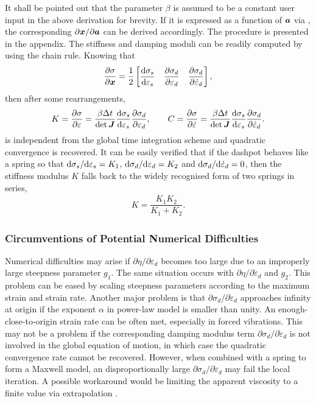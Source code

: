 It shall be pointed out that the parameter $\beta$ is assumed to be a constant user input in the above derivation for brevity. If it is expressed as a function of $\bm{a}$ via , the corresponding $\partial\bm{x}/\partial\bm{a}$ can be derived accordingly. The procedure is presented in the appendix. The stiffness and damping moduli can be readily computed by using the chain rule. Knowing that
\begin{gather}\label{eq:moduli}
\dfrac{\partial{\sigma}}{\partial{\bm{x}}}=\dfrac{1}{2}\begin{bmatrix}
\dfrac{\mathrm{d}\sigma_s}{\mathrm{d}\varepsilon_s}&\dfrac{\partial{\sigma_d}}{\partial{\varepsilon_d}}&\dfrac{\partial{\sigma_d}}{\partial{\dot\varepsilon_d}}
\end{bmatrix},
\end{gather}
then after some rearrangements,
\begin{gather}\label{eq:tangent}
K=\dfrac{\partial{\sigma}}{\partial{\varepsilon}}=\dfrac{\beta\Delta{}t}{\det{\bm{J}}}\dfrac{\mathrm{d}\sigma_s}{\mathrm{d}\varepsilon_s}\dfrac{\partial{\sigma_d}}{\partial{\varepsilon_d}},\qquad{}C=\dfrac{\partial{\sigma}}{\partial{\dot\varepsilon}}=\dfrac{\beta\Delta{}t}{\det{\bm{J}}}\dfrac{\mathrm{d}\sigma_s}{\mathrm{d}\varepsilon_s}\dfrac{\partial{\sigma_d}}{\partial{\dot\varepsilon_d}}.
\end{gather}
 is independent from the global time integration scheme and quadratic convergence is recovered. It can be easily verified that if the dashpot behaves like a spring so that $\mathrm{d}\sigma_s/\mathrm{d}\varepsilon_s=K_1$, $\mathrm{d}\sigma_d/\mathrm{d}\varepsilon_d=K_2$ and $\mathrm{d}\sigma_d/\mathrm{d}\dot\varepsilon_d=0$, then the stiffness modulus $K$ falls back to the widely recognised form of two springs in series,
\begin{gather}
K=\dfrac{K_1K_2}{K_1+K_2}.
\end{gather}
\subsubsection{Circumventions of Potential Numerical Difficulties}
Numerical difficulties may arise if $\partial\eta/\partial\varepsilon_d$ becomes too large due to an improperly large steepness parameter $g_1$. The same situation occurs with $\partial\eta/\partial\dot\varepsilon_d$ and $g_2$. This problem can be eased by scaling steepness parameters according to the maximum strain and strain rate. Another major problem is that $\partial\sigma_d/\partial\dot\varepsilon_d$ approaches infinity at origin if the exponent $\alpha$ in power-law model is smaller than unity. An enough-close-to-origin strain rate can be often met, especially in forced vibrations. This may not be a problem if the corresponding damping modulus term $\partial\sigma_d/\partial\dot\varepsilon_d$ is not involved in the global equation of motion, in which case the quadratic convergence rate cannot be recovered. However, when combined with a spring to form a Maxwell model, an disproportionally large $\partial\sigma_d/\partial\dot\varepsilon_d$ may fail the local iteration. A possible workaround would be limiting the apparent viscosity to a finite value via extrapolation \cite{Wu1998}.

